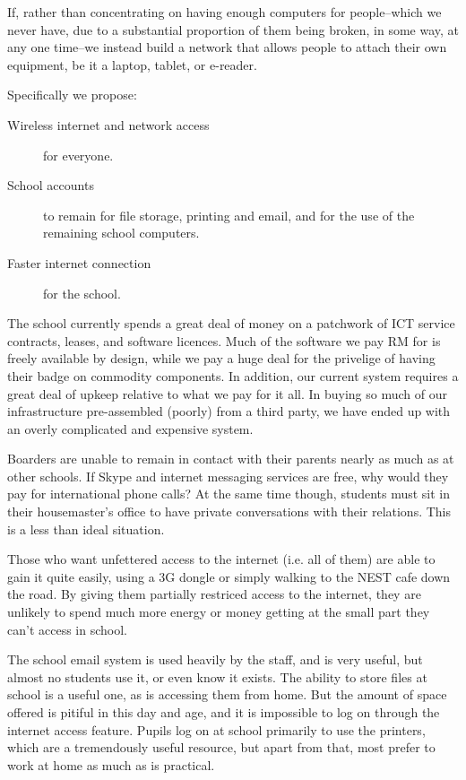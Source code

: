 \documentclass[a4paper,leqno,titlepage]{article}
\begin{document}
If, rather than concentrating on having enough computers for people--which we
never have, due to a substantial proportion of them being broken, in some way,
at any one time--we instead build a network that allows people to attach their
own equipment, be it a laptop, tablet, or e-reader.

Specifically we propose:
    
\begin{description}

\item[Wireless internet and network access] for everyone.
\item[School accounts] to remain for file storage, printing and email, and for
the use of the remaining school computers.
\item[Faster internet connection] for the school.


\end{description}


The school currently spends a great deal of money on a patchwork of ICT
service contracts, leases, and software licences.
Much of the software we pay RM for is freely available by design, while we pay
a huge deal for the privelige of having their badge on commodity components.
In addition, our current system requires a great deal of upkeep relative to
what we pay for it all. In buying so much of our infrastructure pre-assembled
(poorly) from a third party, we have ended up with an overly complicated and
expensive system.


Boarders are unable to remain in contact with their parents nearly as much
as at other schools. If Skype and internet messaging services are free, why
would they pay for international phone calls? At the same time though, students
must sit in their housemaster's office to have private conversations with their
relations. This is a less than ideal situation.

Those who want unfettered access to the internet (i.e. all of them) are
able to gain it quite easily, using a 3G dongle or simply walking to the NEST
cafe down the road. By giving them partially restriced access to the internet,
they are unlikely to spend much more energy or money getting at the small part
they can't access in school.


The school email system is used heavily by the staff, and is very useful, but
almost no students use it, or even know it exists.
The ability to store files at school is a useful one, as is accessing them from
home. But the amount of space offered is pitiful in this day and age, and it is
impossible to log on through the internet access feature.
Pupils log on at school primarily to use the printers, which are a tremendously
useful resource, but apart from that, most prefer to work at home as much as is
practical.
\end{document}
